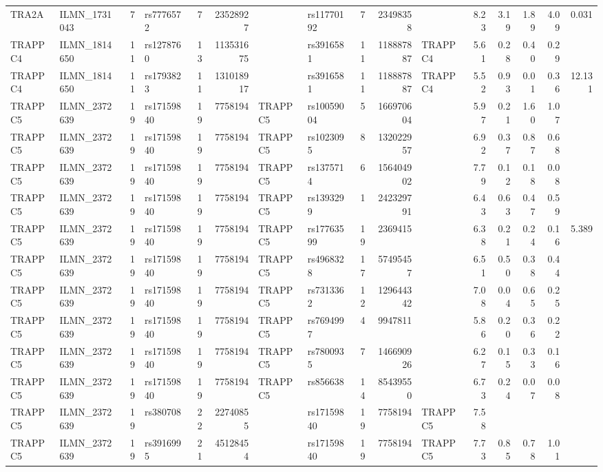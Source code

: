 \documentclass{article}
\begin{document}
\begin{landscape}
{\begin{ThreePartTable}
\begin{longtable}{|llr|lrrl|lrrl|rrrr|r|}
  TRA2A & ILMN\_1731043 & 7 & rs7776572 & 7 & 23528927 &  & rs11770192 & 7 & 23498358 &  & 8.23 & 3.19 & 1.89 & 4.09 & 0.031 \\
  TRAPPC4 & ILMN\_1814650 & 11 & rs1278760 & 13 & 113531675 &  & rs3916581 & 11 & 118887887 & TRAPPC4 & 5.61 & 0.28 & 0.40 & 0.29 &  \\
  TRAPPC4 & ILMN\_1814650 & 11 & rs1793823 & 11 & 131018917 &  & rs3916581 & 11 & 118887887 & TRAPPC4 & 5.52 & 0.93 & 0.01 & 0.36 & 12.131 \\
  TRAPPC5 & ILMN\_2372639 & 19 & rs17159840 & 19 & 7758194 & TRAPPC5 & rs10059004 & 5 & 166970604 &  & 5.97 & 0.21 & 1.60 & 1.07 &  \\
  TRAPPC5 & ILMN\_2372639 & 19 & rs17159840 & 19 & 7758194 & TRAPPC5 & rs1023095 & 8 & 132022957 &  & 6.92 & 0.37 & 0.87 & 0.68 &  \\
  TRAPPC5 & ILMN\_2372639 & 19 & rs17159840 & 19 & 7758194 & TRAPPC5 & rs1375714 & 6 & 156404902 &  & 7.79 & 0.12 & 0.18 & 0.08 &  \\
  TRAPPC5 & ILMN\_2372639 & 19 & rs17159840 & 19 & 7758194 & TRAPPC5 & rs1393299 & 1 & 242329791 &  & 6.43 & 0.63 & 0.47 & 0.59 &  \\
  TRAPPC5 & ILMN\_2372639 & 19 & rs17159840 & 19 & 7758194 & TRAPPC5 & rs17763599 & 19 & 2369415 &  & 6.38 & 0.21 & 0.24 & 0.16 & 5.389 \\
  TRAPPC5 & ILMN\_2372639 & 19 & rs17159840 & 19 & 7758194 & TRAPPC5 & rs4968328 & 17 & 57495457 &  & 6.51 & 0.50 & 0.38 & 0.44 &  \\
  TRAPPC5 & ILMN\_2372639 & 19 & rs17159840 & 19 & 7758194 & TRAPPC5 & rs7313362 & 12 & 129644342 &  & 7.08 & 0.04 & 0.65 & 0.25 &  \\
  TRAPPC5 & ILMN\_2372639 & 19 & rs17159840 & 19 & 7758194 & TRAPPC5 & rs7694997 & 4 & 9947811 &  & 5.86 & 0.20 & 0.36 & 0.22 &  \\
  TRAPPC5 & ILMN\_2372639 & 19 & rs17159840 & 19 & 7758194 & TRAPPC5 & rs7800935 & 7 & 146690926 &  & 6.27 & 0.15 & 0.33 & 0.16 &  \\
  TRAPPC5 & ILMN\_2372639 & 19 & rs17159840 & 19 & 7758194 & TRAPPC5 & rs856638 & 14 & 85439550 &  & 6.73 & 0.24 & 0.07 & 0.08 &  \\
  TRAPPC5 & ILMN\_2372639 & 19 & rs380708 & 22 & 22740855 &  & rs17159840 & 19 & 7758194 & TRAPPC5 & 7.58 &  &  &  &  \\
  TRAPPC5 & ILMN\_2372639 & 19 & rs3916995 & 21 & 45128454 &  & rs17159840 & 19 & 7758194 & TRAPPC5 & 7.73 & 0.85 & 0.78 & 1.01 &  \\

\end{longtable}
\end{ThreePartTable}}
\end{landscape}
\end{document}
